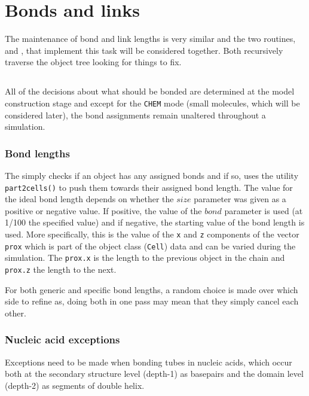 \section{Bonds and links}

The maintenance of bond and link lengths is very similar and the two routines,
 and , that implement this task will be considered together.
Both recursively traverse the object tree looking for things to fix.

\subsection{}

All of the decisions about what should be bonded are determined at the model
construction stage and except for the {\tt CHEM} mode (small molecules, which will
be considered later), the bond assignments remain unaltered throughout a simulation.

\subsubsection{Bond lengths}

The  simply checks if an object has any assigned bonds and if so, uses
the utility {\tt part2cells()} to push them towards their assigned bond length.
The value for the ideal bond length depends on whether the $size$ parameter was 
given as a positive or negative value.  If positive, the value of the $bond$ 
parameter is used (at 1/100 the specified value) and if negative, the starting
value of the bond length is used.   More specifically, this is the value of the
{\tt x} and {\tt z} components of the vector {\tt prox} which is part of the object
class ({\tt Cell}) data and can be varied during the simulation.   The {\tt prox.x} is
the length to the previous object in the chain and  {\tt prox.z} the length to the next.

For both generic and specific bond lengths, a random choice is made over which side
to refine as, doing both in one pass may mean that they simply cancel each other.

\subsubsection{Nucleic acid exceptions}

Exceptions need to be made when bonding tubes in nucleic acids, which occur both at
the secondary structure level (depth-1) as basepairs and the domain level (depth-2)
as segments of double helix. 

